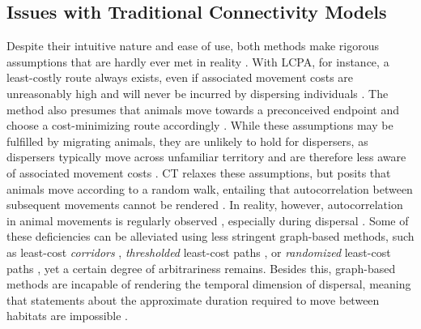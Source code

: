 \documentclass[abstract=on,10pt,a4paper,bibliography=totocnumbered]{article}
\begin{document}
\subsection{Issues with Traditional Connectivity Models}
Despite their intuitive nature and ease of use, both methods make rigorous
assumptions that are hardly ever met in reality \citep{Diniz.2019}. With LCPA,
for instance, a least-costly route always exists, even if associated movement
costs are unreasonably high and will never be incurred by dispersing individuals
\citep{Sawyer.2011}. The method also presumes that animals move towards a
preconceived endpoint and choose a cost-minimizing route accordingly
\citep{Abrahms.2017}. While these assumptions may be fulfilled by migrating
animals, they are unlikely to hold for dispersers, as dispersers typically move
across unfamiliar territory and are therefore less aware of associated movement
costs \citep{Koen.2014, Cozzi.2020}. CT relaxes these assumptions, but posits
that animals move according to a random walk, entailing that autocorrelation
between subsequent movements cannot be rendered \citep{Diniz.2019}. In reality,
however, autocorrelation in animal movements is regularly observed
\citep{Bovet.1991, Schultz.2001}, especially during dispersal \citep{Cozzi.2020,
Hofmann.2021}. Some of these deficiencies can be alleviated using less stringent
graph-based methods, such as least-cost \textit{corridors} \citep{Pinto.2009},
\textit{thresholded} least-cost paths \citep{Landguth.2012}, or
\textit{randomized} least-cost paths \citep{Panzacchi.2016}, yet a certain
degree of arbitrariness remains. Besides this, graph-based methods are incapable
of rendering the temporal dimension of dispersal, meaning that statements about
the approximate duration required to move between habitats are impossible
\citep{Martensen.2017, Diniz.2019}.

\end{document}
